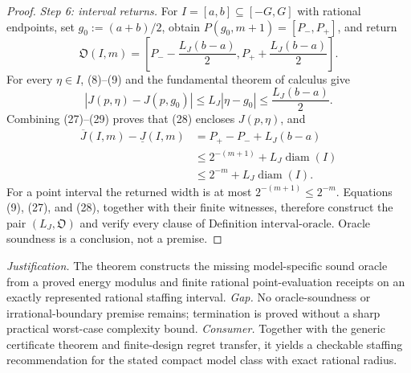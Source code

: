 \documentclass{article}
\begin{document}
\begin{proof}
\emph{Step 6: interval returns.}
For \(I=[a,b]\subseteq[-G,G]\) with rational endpoints, set \(g_0:=(a+b)/2\), obtain \(P(g_0,m+1)=[P_-,P_+]\), and return
\[
 \mathfrak O(I,m)=
 \left[P_--\frac{L_J(b-a)}2,
 P_++\frac{L_J(b-a)}2\right].
\tag{28}
\]
For every \(\eta\in I\), (8)--(9) and the fundamental theorem of calculus give
\[
 |J(p,\eta)-J(p,g_0)|
 \leq L_J|\eta-g_0|
 \leq\frac{L_J(b-a)}2.
\tag{29}
\]
Combining (27)--(29) proves that (28) encloses \(J(p,\eta)\), and
\[
 \begin{aligned}
 \overline J(I,m)-\underline J(I,m)
 &=P_+-P_-+L_J(b-a)\\
 &\leq2^{-(m+1)}+L_J\operatorname{diam}(I)\\
 &\leq2^{-m}+L_J\operatorname{diam}(I).
 \end{aligned}
\tag{30}
\]
For a point interval the returned width is at most \(2^{-(m+1)}\leq2^{-m}\).  Equations (9), (27), and (28), together with their finite witnesses, therefore construct the pair \((L_J,\mathfrak O)\) and verify every clause of Definition \(\mathrm{interval\mbox{-}oracle}\).  Oracle soundness is a conclusion, not a premise.
\end{proof}
\par\smallskip\noindent \textit{Justification.} The theorem constructs the missing model-specific sound oracle from a proved energy modulus and finite rational point-evaluation receipts on an exactly represented rational staffing interval. \textit{Gap.} No oracle-soundness or irrational-boundary premise remains; termination is proved without a sharp practical worst-case complexity bound. \textit{Consumer.} Together with the generic certificate theorem and finite-design regret transfer, it yields a checkable staffing recommendation for the stated compact model class with exact rational radius.
\end{document}

